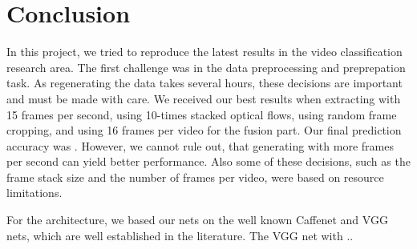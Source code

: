 \section{Conclusion}
\label{sec:conclusion}

In this project, we tried to reproduce the latest results in the video classification research area.
The first challenge was in the data preprocessing and preprepation task.
As regenerating the data takes several hours, these decisions are important and must be made with care.
We received our best results when extracting with 15 frames per second, using 10-times stacked optical flows, using random frame cropping, and using 16 frames per video for the fusion part.
Our final prediction accuracy was .
However, we cannot rule out, that generating with more frames per second can yield better performance.
Also some of these decisions, such as the frame stack size and the number of frames per video, were based on resource limitations.

For the architecture, we based our nets on the well known Caffenet and VGG nets, which are well established in the literature.
The VGG net with  ..
